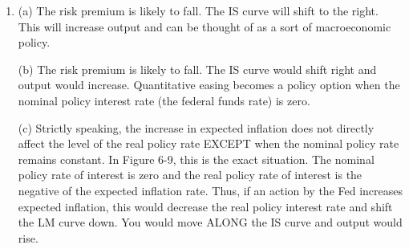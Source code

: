 \documentclass[12pt]{article}
\begin{document}
\begin{enumerate}[label=\arabic*.]
    (2) No. Increasing money supply moves the LM curve downwards. Therefore, ZLB will be hit at some point. At that time,
    there wil be no way to increase (stabalize) the
    output again.

    (3) Unconventional monetary policies. \textit{e.g.,} Quantitative easing; Forward guiding.
    \item (a) The risk premium is likely to fall. The IS curve will shift to the right. This will increase output and can be thought of as a sort of macroeconomic policy.
    
    (b) The risk premium is likely to fall. The IS curve would shift right and output would increase. Quantitative easing becomes a policy option when the nominal policy interest rate (the federal funds rate) is zero.

    (c) Strictly speaking, the increase in expected inflation does not directly affect the level of the real policy rate EXCEPT when the nominal policy rate remains constant. In Figure 6-9, this is the exact situation. The nominal policy rate of interest is zero and the real policy rate of interest is the negative of the expected inflation rate. Thus, if an action by the Fed increases expected inflation, this would decrease the real policy interest rate and shift the LM curve down. You would move ALONG the IS curve and output would rise.
\end{enumerate}
\end{document}
